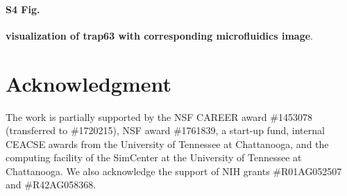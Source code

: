 \documentclass[conference]{IEEEtran}
\begin{document}


\paragraph*{S4 Fig.}
\label{S4_Fig}
{\bf visualization of trap63 with corresponding microfluidics image}. 







\section*{Acknowledgment}

The work is partially supported by the NSF CAREER award \#1453078 (transferred to \#1720215), NSF award \#1761839, a  start-up fund, internal CEACSE awards from the University of Tennessee at Chattanooga, and the computing facility of the SimCenter at the University of Tennessee at Chattanooga. We also acknowledge the support of NIH grants \#R01AG052507 and \#R42AG058368.
\end{document}
